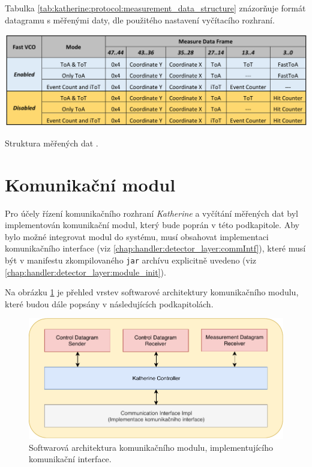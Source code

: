 Tabulka \ref{tab:katherine:protocol:measurement_data_structure} znázorňuje formát datagramu s měřenými daty, dle použitého nastavení vyčítacího rozhraní.

\begin{table}[h!]
    \begin{center}
        \includegraphics[width=14cm]{figures/katherine_pixel_measurement_data.png}
        \caption{Struktura měřených dat \cite{katherine_docs}.}
        \label{tab:katherine:protocol:measurement_data_structure}
    \end{center}
\end{table}

\section{Komunikační modul}\label{chap:katherine:comm}
Pro účely řízení komunikačního rozhraní \textit{Katherine} a vyčítání měřených dat byl implementován komunikační modul, který bude poprán v této podkapitole. Aby bylo možné integrovat modul do systému, musí obsahovat implementaci komunikačního interface (viz \ref{chap:handler:detector_layer:commIntf}), které musí být v manifestu zkompilovaného \texttt{jar} archívu explicitně uvedeno (viz \ref{chap:handler:detector_layer:module_init}).

Na obrázku \ref{fig:katherine:comm:arch} je přehled vrstev softwarové architektury komunikačního modulu, které budou dále popsány v následujících podkapitolách.

\begin{figure}[h]
	\begin{center}
		\includegraphics[width=14cm]{figures/katherine_comm_arch.pdf}
		\caption{Softwarová architektura komunikačního modulu, implementujícího komunikační interface.}
		\label{fig:katherine:comm:arch}
	\end{center}
\end{figure}

